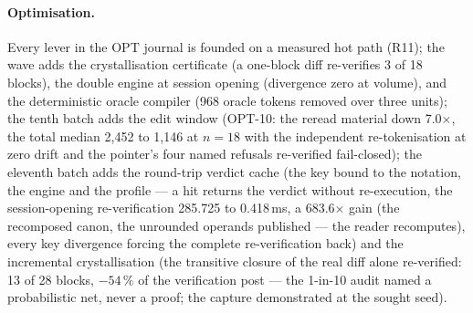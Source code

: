 \documentclass[10pt,a4paper]{article}
\begin{document}
\paragraph{Optimisation.} Every lever in the OPT journal is founded on
a measured hot path (R11); the wave adds the crystallisation certificate
(a one-block diff re-verifies 3 of 18 blocks), the double engine at
session opening (divergence zero at volume), and the deterministic
oracle compiler (968 oracle tokens removed over three units); the
tenth batch adds the edit window (OPT-10: the reread material down
7.0$\times$, the total median 2{,}452 to 1{,}146 at $n{=}18$ with the
independent re-tokenisation at zero drift and the pointer's four
named refusals re-verified fail-closed); the eleventh batch adds the
round-trip verdict cache (the key bound to the notation, the engine
and the profile --- a hit returns the verdict without re-execution,
the session-opening re-verification 285.725 to 0.418\,ms, a
683.6$\times$ gain (the recomposed canon, the unrounded operands
published --- the reader recomputes), every key divergence forcing
the complete re-verification back) and the incremental crystallisation (the transitive closure of
the real diff alone re-verified: 13 of 28 blocks, $-54\,\%$ of the
verification post --- the 1-in-10 audit named a probabilistic net,
never a proof; the capture demonstrated at the sought seed).
\end{document}

